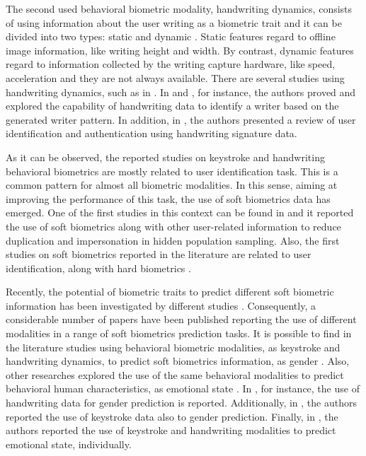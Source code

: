 \documentclass[conference]{IEEEtran}
\begin{document}
The second used behavioral biometric modality, handwriting dynamics, consists of using information about the user writing as a biometric trait and it can be divided into two types: static and dynamic \cite{hw-recognition}. Static features regard to offline image information, like writing height and width. By contrast, dynamic features regard to information collected by the writing capture hardware, like speed, acceleration and they are not always available. 
There are several studies using handwriting dynamics, such as in \cite{hw-individuality,hw-writer-id,hw-recognition}. In \cite{hw-individuality} and \cite{hw-writer-id}, for instance, the authors proved and explored the capability of handwriting data to identify a writer based on the generated writer pattern. In addition, in \cite{hw-recognition}, the authors presented a review of user identification and authentication using handwriting signature data.

As it can be observed, the reported studies on keystroke and handwriting behavioral biometrics are mostly related to user identification task.
This is a common pattern for almost all biometric modalities. In this sense, aiming at improving the performance of this task, the use of soft biometrics data has emerged. One of the first studies in this context can be found in \cite{first-study} and it reported the use of soft biometrics along with other user-related information to reduce duplication and impersonation in hidden population sampling. Also, the first studies on soft biometrics reported in the literature are related to user identification, along with hard biometrics \cite{jain-assist, jain-personal-recog, jain-integrating}.

Recently,  the potential of biometric traits to predict different soft biometric information has been investigated by different studies \cite{cheng-hw-gender, hw-gender1, ks-emotion1, cheng-emotional, cheng-thesis}. 
Consequently, a considerable number of papers have been published reporting the use of different modalities in a range of soft biometrics prediction tasks. It is possible to find in the literature studies using behavioral biometric modalities, as keystroke and handwriting dynamics, to predict soft biometrics information, as gender \cite{cheng-hw-gender, hw-gender1}. 
Also, other researches explored the use of the same behavioral modalities to predict behavioral human characteristics, as emotional state \cite{ks-emotion1, cheng-emotional, cheng-thesis}. In \cite{hw-gender1, hw-gender2, hw-gender3}, for instance, the use of handwriting data for gender prediction is reported. Additionally, in \cite{cheng-thesis, ks-gender1}, the authors reported the use of keystroke data also to gender prediction. Finally, in \cite{cheng-emotional, ks-emotion1, ks-emotion2-mouse}, the authors reported the use of keystroke and handwriting modalities to predict emotional state, individually.
\end{document}
